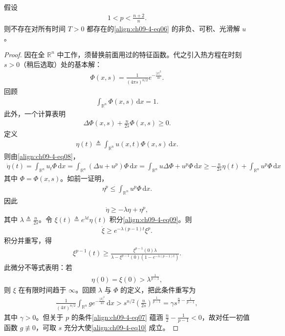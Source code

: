 \documentclass[../../main.tex]{subfiles}
\begin{document}
\begin{theorem}[小初值下的爆破]\label{theorem:ch09-4-2-小初值爆破}
假设
\begin{align}
1<p<\frac{n+2}{n}.\label{align:ch09-4-eq07}
\end{align}
则不存在对所有时间 $T>0$ 都存在的\eqref{align:ch09-4-eq06} 的非负、可积、光滑解 $u$。
\begin{proof}
因在全 $\mathbb{R}^n$ 中工作，须替换前面用过的特征函数。代之引入热方程在时刻 $s>0$（稍后选取）处的基本解：
\begin{align*}
\Phi(x,s)=\frac1{(4\pi s)^{n/2}}e^{-\frac{|x|^2}{4s}}.
\end{align*}
回顾
\begin{align*}
\int_{\mathbb{R}^n}\Phi(x,s)\,\mathrm{d}x=1.
\end{align*}
此外，一个计算表明
\begin{align}
\Delta\Phi(x,s)+\frac{n}{2s}\Phi(x,s)\geqslant 0.\label{align:ch09-4-eq08}
\end{align}
定义
\begin{align*}
\eta(t)\triangleq\int_{\mathbb{R}^n}u(x,t)\Phi(x,s)\,\mathrm{d}x.
\end{align*}
则由\eqref{align:ch09-4-eq08}，
\begin{align*}
\dot\eta(t)=\int_{\mathbb{R}^n}u_t\Phi\,\mathrm{d}x=\int_{\mathbb{R}^n}(\Delta u+u^p)\Phi\,\mathrm{d}x=\int_{\mathbb{R}^n}u\Delta\Phi+u^p\Phi\,\mathrm{d}x\geqslant-\frac{n}{2s}\eta(t)+\int_{\mathbb{R}^n}u^p\Phi\,\mathrm{d}x
\end{align*}
其中 $\Phi=\Phi(x,s)$。如前一证明，
\begin{align*}
\eta^p\leqslant\int_{\mathbb{R}^n}u^p\Phi\,\mathrm{d}x.
\end{align*}
因此
\begin{align}
\dot\eta\geqslant-\lambda\eta+\eta^p,\label{align:ch09-4-eq09}
\end{align}
其中 $\lambda\triangleq\frac{n}{2s}$。令 $\xi(t)\triangleq e^{\lambda t}\eta(t)$ 积分\eqref{align:ch09-4-eq09}。则
\begin{align*}
\dot\xi\geqslant e^{-\lambda(p-1)t}\xi^p.
\end{align*}
积分并重写，得
\begin{align*}
\xi^{p-1}(t)\geqslant\frac{\xi^{p-1}(0)\lambda}{\lambda-\xi^{p-1}(0)(1-e^{-\lambda(p-1)t})}.
\end{align*}
此微分不等式表明：若
\begin{align*}
\eta(0)=\xi(0)>\lambda^{\frac1{p-1}},
\end{align*}
则 $\xi$ 在有限时间趋于 $\infty$。回顾 $\lambda$ 与 $\Phi$ 的定义，把此条件重写为
\begin{align}
\frac1{(4\pi)^{n/2}}\int_{\mathbb{R}^n}ge^{-\frac{|x|^2}{4s}}\,\mathrm{d}x>s^{n/2}\left(\frac{n}{2s}\right)^{\frac1{p-1}}=\gamma s^{\frac n2-\frac1{p-1}},\label{align:ch09-4-eq10}
\end{align}
其中 $\gamma>0$。但关于 $p$ 的条件\eqref{align:ch09-4-eq07} 蕴涵 $\frac n2-\frac1{p-1}<0$，故对任一初值函数 $g\not\equiv 0$，可取 $s$ 充分大使\eqref{align:ch09-4-eq10} 成立。
\end{proof}
\end{theorem}
\end{document}
